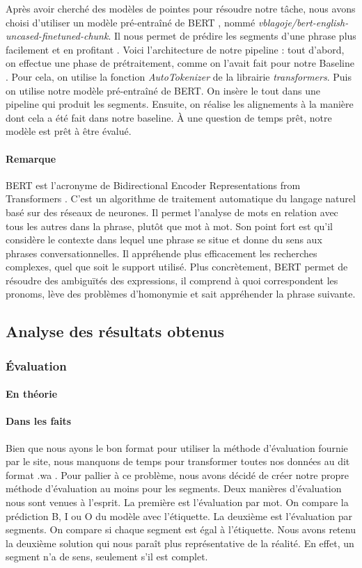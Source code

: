 \documentclass[a4paper, twoside, 11pt]{article}
\begin{document}
 Après avoir cherché des modèles de pointes pour résoudre notre tâche, nous avons choisi d’utiliser un modèle pré-entraîné de \og BERT \fg{}, nommé \textit{vblagoje/bert-english-uncased-finetuned-chunk}. Il nous permet de prédire les segments d’une phrase plus facilement et en profitant . Voici l’architecture de notre pipeline : tout d’abord, on effectue une phase de prétraitement, comme on l'avait fait pour notre \og Baseline \fg{}. Pour cela, on utilise la fonction \textit{AutoTokenizer} de la librairie \textit{transformers}. Puis on utilise notre modèle pré-entraîné de BERT. On insère le tout dans une pipeline qui produit les segments. Ensuite, on réalise les alignements à la manière dont cela a été fait dans notre baseline. À une question de temps prêt, notre modèle est prêt à être évalué.
\paragraph{Remarque}
 BERT est l’acronyme de \og Bidirectional Encoder Representations from Transformers \fg{}. C’est un algorithme de traitement automatique du langage naturel basé sur des réseaux de neurones. Il permet l’analyse de mots en relation avec tous les autres dans la phrase, plutôt que mot à mot. Son point fort est qu’il considère le contexte dans lequel une phrase se situe et donne du sens aux phrases conversationnelles. Il appréhende plus efficacement les recherches complexes, quel que soit le support utilisé. Plus concrètement, BERT permet de résoudre des ambiguïtés des expressions, il comprend à quoi correspondent les pronoms, lève des problèmes d’homonymie et sait appréhender la phrase suivante.

 \subsection{Analyse des résultats obtenus}
 \subsubsection{Évaluation}
 \paragraph{En théorie}
 \paragraph{Dans les faits}
 Bien que nous ayons le bon format pour utiliser la méthode d’évaluation fournie par le site, nous manquons de temps pour transformer toutes nos données au dit format \og .wa \fg{}. Pour pallier à ce problème, nous avons décidé de créer notre propre méthode d’évaluation au moins pour les segments. Deux manières d’évaluation nous sont venues à l’esprit. La première est l’évaluation par mot. On compare la prédiction B, I ou O du modèle avec l'étiquette. La deuxième est l’évaluation par segments. On compare si chaque segment est égal à l'étiquette. Nous avons retenu la deuxième solution qui nous paraît plus représentative de la réalité. En effet, un segment n’a de sens, seulement s’il est complet.
\end{document}
